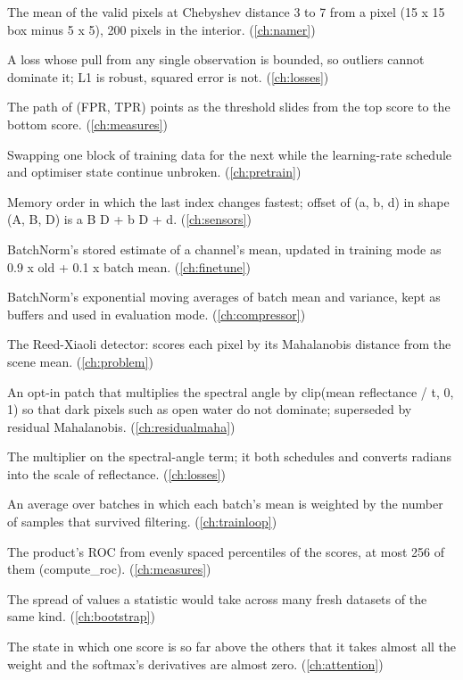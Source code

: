 \begin{description}[style=nextline,leftmargin=1.2em,font=\normalfont\bfseries]
\item[Ring mean] The mean of the valid pixels at Chebyshev distance 3 to 7 from a pixel (15 x 15 box minus 5 x 5), 200 pixels in the interior. (\cref{ch:namer})
\item[Robust loss] A loss whose pull from any single observation is bounded, so outliers cannot dominate it; L1 is robust, squared error is not. (\cref{ch:losses})
\item[ROC curve] The path of (FPR, TPR) points as the threshold slides from the top score to the bottom score. (\cref{ch:measures})
\item[Rotation] Swapping one block of training data for the next while the learning-rate schedule and optimiser state continue unbroken. (\cref{ch:pretrain})
\item[Row-major order] Memory order in which the last index changes fastest; offset of (a, b, d) in shape (A, B, D) is a B D + b D + d. (\cref{ch:sensors})
\item[Running mean] BatchNorm's stored estimate of a channel's mean, updated in training mode as 0.9 x old + 0.1 x batch mean. (\cref{ch:finetune})
\item[Running statistics] BatchNorm's exponential moving averages of batch mean and variance, kept as buffers and used in evaluation mode. (\cref{ch:compressor})
\item[RX detector] The Reed-Xiaoli detector: scores each pixel by its Mahalanobis distance from the scene mean. (\cref{ch:problem})
\item[SAM dark fade] An opt-in patch that multiplies the spectral angle by clip(mean reflectance / t, 0, 1) so that dark pixels such as open water do not dominate; superseded by residual Mahalanobis. (\cref{ch:residualmaha})
\item[SAM weight (lambda)] The multiplier on the spectral-angle term; it both schedules and converts radians into the scale of reflectance. (\cref{ch:losses})
\item[Sample-weighted average] An average over batches in which each batch's mean is weighted by the number of samples that survived filtering. (\cref{ch:trainloop})
\item[Sampled ROC] The product's ROC from evenly spaced percentiles of the scores, at most 256 of them (compute\_roc). (\cref{ch:measures})
\item[Sampling distribution] The spread of values a statistic would take across many fresh datasets of the same kind. (\cref{ch:bootstrap})
\item[Saturation (softmax)] The state in which one score is so far above the others that it takes almost all the weight and the softmax's derivatives are almost zero. (\cref{ch:attention})

\end{description}
